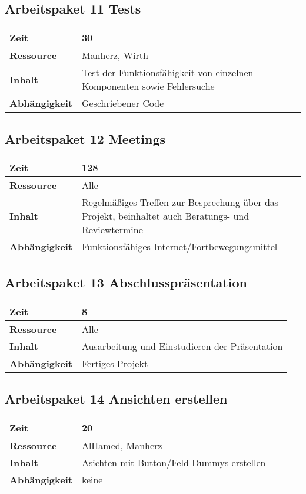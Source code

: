 \documentclass[12pt,a4paper,onecolumn]{article}
\begin{document}
\subsection{Arbeitspaket 11 Tests}
\begin{tabularx}{\textwidth}{|l|X|}
\hline
     \textbf{Zeit} & 30\\
     \hline
     \textbf{Ressource} & Manherz, Wirth\\
     \hline
     \textbf{Inhalt} & Test der Funktionsfähigkeit von einzelnen Komponenten sowie Fehlersuche\\
     \hline
     \textbf{Abhängigkeit} & Geschriebener Code\\
\hline
\end{tabularx}

\subsection{Arbeitspaket 12 Meetings}
\begin{tabularx}{\textwidth}{|l|X|}
\hline
     \textbf{Zeit} & 128\\
     \hline
     \textbf{Ressource} & Alle\\
     \hline
     \textbf{Inhalt} & Regelmäßiges Treffen zur Besprechung über das Projekt, beinhaltet auch Beratungs- und Reviewtermine\\
     \hline
     \textbf{Abhängigkeit} & Funktionsfähiges Internet/Fortbewegungsmittel\\
\hline
\end{tabularx}

\subsection{Arbeitspaket 13 Abschlusspräsentation}
\begin{tabularx}{\textwidth}{|l|X|}
\hline
     \textbf{Zeit} &  8\\
     \hline
     \textbf{Ressource} & Alle\\
     \hline
     \textbf{Inhalt} &  Ausarbeitung und Einstudieren der Präsentation\\
     \hline
     \textbf{Abhängigkeit} & Fertiges Projekt\\
\hline
\end{tabularx}

\subsection{Arbeitspaket 14 Ansichten erstellen}
\begin{tabularx}{\textwidth}{|l|X|}
\hline
     \textbf{Zeit} & 20 \\
     \hline
     \textbf{Ressource} & AlHamed, Manherz\\
     \hline
     \textbf{Inhalt} & Asichten mit Button/Feld Dummys erstellen\\
     \hline
     \textbf{Abhängigkeit} & keine\\
\hline
\end{tabularx}
\end{document}
